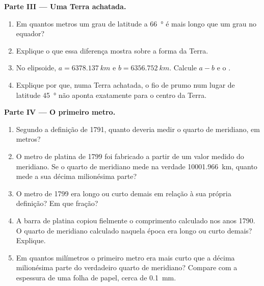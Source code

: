 \begin{problem}
\medskip
\noindent\textbf{Parte III --- Uma Terra achatada.}
\begin{enumerate}[resume]
  \item Em quantos metros um grau de latitude a \qty{66}{\degree} é mais
        longo que um grau no equador?
  \item Explique o que essa diferença mostra sobre a forma da Terra.
  \item No elipsoide, $a = \qty{6378.137}{km}$ e
        $b = \qty{6356.752}{km}$. Calcule $a - b$ e o .
  \item Explique por que, numa Terra achatada, o fio de prumo num lugar de
        latitude \qty{45}{\degree} não aponta exatamente para o centro da
        Terra.
\end{enumerate}

\medskip
\noindent\textbf{Parte IV --- O primeiro metro.}
\begin{enumerate}[resume]
  \item Segundo a definição de 1791, quanto deveria medir o quarto de
        meridiano, em metros?
  \item O metro de platina de 1799 foi fabricado a partir de um valor
        medido do meridiano. Se o quarto de meridiano mede na verdade
        \qty{10001.966}{km}, quanto mede a sua décima milionésima parte?
  \item O metro de 1799 era longo ou curto demais em relação à sua própria
        definição? Em que fração?
  \item A barra de platina copiou fielmente o comprimento calculado nos
        anos 1790. O quarto de meridiano calculado naquela época era longo
        ou curto demais? Explique.
  \item Em quantos milímetros o primeiro metro era mais curto que a décima
        milionésima parte do verdadeiro quarto de meridiano? Compare com a
        espessura de uma folha de papel, cerca de \qty{0.1}{mm}.
\end{enumerate}
\end{problem}
